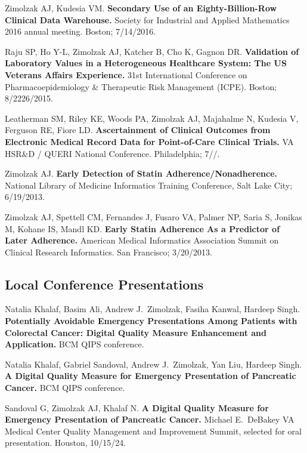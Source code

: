 \documentclass[10pt]{article}
\begin{document}
Zimolzak AJ, Kudesia VM. \textbf{Secondary Use of an
  Eighty-Billion-Row Clinical Data Warehouse.} Society for Industrial
and Applied Mathematics 2016 annual meeting. Boston; 7/14/2016.

Raju SP, Ho Y-L, Zimolzak AJ, Katcher B, Cho K, Gagnon DR.
\textbf{Validation of Laboratory Values in a Heterogeneous Healthcare
  System: The US Veterans Affairs Experience.} 31st International
Conference on Pharmacoepidemiology \& Therapeutic Risk Management
(ICPE). Boston; 8/22\ndash{}26/2015.

Leatherman SM, Riley KE, Woods PA, Zimolzak AJ, Majahalme N, Kudesia
V, Ferguson RE, Fiore LD. \textbf{Ascertainment of Clinical Outcomes
  from Electronic Medical Record Data for Point-of-Care Clinical
  Trials.} VA HSR\&D / QUERI National Conference. Philadelphia;
7/\ndash{}/.

Zimolzak AJ. \textbf{Early Detection of Statin
  Adherence/Nonadherence.} National Library of Medicine Informatics
Training Conference, Salt Lake City; 6/19/2013.

Zimolzak AJ, Spettell CM, Fernandes J, Fusaro VA, Palmer NP, Saria S,
Jonikas M, Kohane IS, Mandl KD. \textbf{Early Statin Adherence As a
  Predictor of Later Adherence.} American Medical Informatics
Association Summit on Clinical Research Informatics. San Francisco;
3/20/2013.


\subsection{Local Conference Presentations}  %



Natalia Khalaf, Basim Ali, Andrew J.\ Zimolzak, Fasiha Kanwal, Hardeep Singh. \textbf{Potentially Avoidable Emergency Presentations Among Patients with Colorectal Cancer: Digital Quality Measure Enhancement and Application.} BCM QIPS conference.  %

Natalia Khalaf, Gabriel Sandoval, Andrew J.\ Zimolzak, Yan Liu,
Hardeep Singh. \textbf{A Digital Quality Measure for Emergency
  Presentation of Pancreatic Cancer.} BCM QIPS conference.

Sandoval G, Zimolzak AJ, Khalaf N. \textbf{A Digital Quality Measure
  for Emergency Presentation of Pancreatic Cancer.} Michael
E.\ DeBakey VA Medical Center Quality Management and Improvement
Summit, selected for oral presentation. Houston, 10/15/24.
\end{document}
